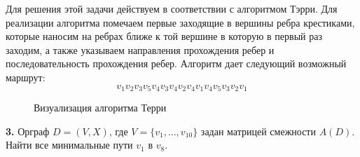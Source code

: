 \documentclass[12pt, letterpaper, titlepage]{article}
\begin{document}
Для решения этой задачи действуем в соответствии с алгоритмом Тэрри.
Для реализации алгоритма помечаем первые заходящие в вершины ребра крестиками, которые наносим на
ребрах ближе к той вершине в которую в первый
раз заходим, а также указываем направления прохождения ребер и последовательность
прохождения ребер. Алгоритм дает следующий возможный маршрут:
\begin{equation*}
    v_1v_2v_3v_5v_4v_3v_4v_2v_4v_1v_4v_5v_3v_2v_1
\end{equation*}
\begin{figure}[H]\centering\caption{Визуализация алгоритма Терри}\end{figure}

\textbf{3.} Орграф $D=(V,X)$, где $V = \{v_1, \dots, v_{10}\}$ задан матрицей
смежности $A(D)$. Найти все минимальные пути $v_1$ в $v_{8}$.
\end{document}

